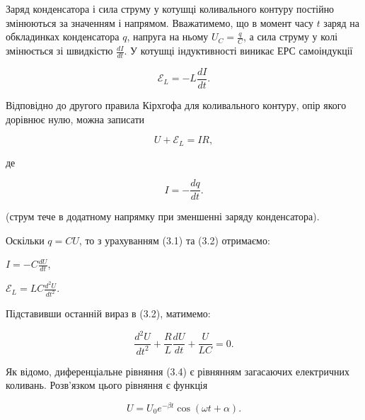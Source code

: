 \documentclass[12pt,a4paper]{article}
\begin{document}
    Заряд конденсатора і сила струму у котушці коливального контуру постійно змінюються
    за значенням і напрямом. Вважатимемо, що в момент часу $t$ заряд на обкладинках
    конденсатора $q$, напруга на ньому $\displaystyle U_C = \frac{q}{C}$, а сила струму у колі
    змінюється зі швидкістю $\displaystyle \frac{dI}{dt}$. У котушці індуктивності виникає ЕРС самоіндукції

    \begin{equation}
        \mathcal{E}_L = -L\frac{dI}{dt}.
        \tag{3.1}
    \end{equation}

    Відповідно до другого правила Кірхгофа для коливального контуру, опір якого дорівнює нулю, можна записати

    \begin{equation}
        U + \mathcal{E}_L = IR,
        \tag{3.2}
    \end{equation}

    де

    \begin{equation}
        I = -\frac{dq}{dt}.
        \tag{3.3}
    \end{equation}

    (струм тече в додатному напрямку при зменшенні заряду конденсатора).

    Оскільки $q = CU$, то з урахуванням (3.1) та (3.2) отримаємо:

    \begin{center}
        $\displaystyle I = -C \frac{dU}{dt}$,
    \end{center}

    \begin{center}
        $\displaystyle \mathcal{E}_L = LC \frac{d^2U}{dt^2}$.
    \end{center}

    Підставивши останній вираз в (3.2), матимемо:

    \begin{equation}
        \frac{d^2U}{dt^2} + \frac{R}{L} \frac{dU}{dt} + \frac{U}{LC} = 0.
        \tag{3.4}
    \end{equation}

    Як відомо, диференціальне рівняння (3.4) є рівнянням загасаючих електричних коливань.
    Розв’язком цього рівняння є функція

    \begin{equation}
        U = U_0e^{-\beta t} \cos(\omega t + \alpha).
        \tag{3.5}
    \end{equation}
\end{document}
